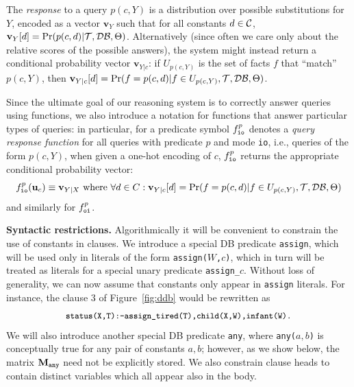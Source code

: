 \documentclass{article}
\newcommand{\cd}[1]{{\small \texttt{#1}}}
\newcommand{\mysubsection}[1]{\textbf{{#1}.}}
\newif\iflong
\newcommand{\longonly}[1]{\iflong{#1}\fi}
\newcommand{\trm}[1]{\textit{#1}}
\newcommand{\vek}[1]{\textbf{#1}}
\newcommand{\M}{\textbf{M}}
\newcommand{\C}{{\cal{C}}}
\newcommand{\T}{{\cal{T}}}
\newcommand{\DB}{{\cal{DB}}}
\begin{document}
The \trm{response} to a query $p(c,Y)$ is a distribution over possible
substitutions for $Y$, encoded as a vector $\vek{v}_{Y}$ such that for
all constants $d\in\C$, $\vek{v}_{Y}[d] = \Pr(p(c,d)|\T,\DB,\Theta)$.
Alternatively (since often we care only about the relative scores of
the possible answers), the system might instead return a conditional
probability vector $\vek{v}_{Y|c}$: if $U_{p(c,Y)}$ is the set
of facts $f$ that ``match'' $p(c,Y)$, then $\vek{v}_{Y|c}[d] =
\Pr(f=p(c,d)|f\in{}U_{p(c,Y)},\T,\DB,\Theta)$.

\longonly{Although here we only consider single-literal queries, more
  complex queries can be answered by extending the theory: e.g., to
  find $\{ Y: \cd{uncle(joe,X),husband(X,$Y$)}\}$, we could add the
  clause \cd{q1(J,Y):-uncle(joe,X),husband(X,Y)} to the theory and
  find the answer to \cd{q1(joe,Y)}.}

Since the ultimate goal of our reasoning system is to correctly answer
queries using functions, we also introduce a notation for functions
that answer particular types of queries: in particular, for a
predicate symbol $f^p_\cd{io}$ denotes a \trm{query response function}
for all queries with predicate $p$ and mode \cd{io}, i.e., queries of
the form $p(c,Y)$, when given a one-hot encoding of $c$, $f^p_\cd{io}$
returns the appropriate conditional probability vector:
\begin{equation} \label{eq:def-f}
 f^p_\cd{io}(\vek{u}_c) \equiv \vek{v}_{Y|X} 
    \mbox{~where~} \forall d\in C: \vek{v}_{Y|c}[d] =
             \Pr(f=p(c,d)|f\in{}U_{p(c,Y)},\T,\DB,\Theta)
\end{equation}
and similarly for $f^p_\cd{oi}$.

\mysubsection{Syntactic restrictions}
Algorithmically it will be convenient to constrain the use of
constants in clauses.  We introduce a special DB predicate
\cd{assign}, which will be used only in literals of the form
\cd{assign($W$,$c$)}, which in turn will be treated as literals for a
special unary predicate \cd{assign\_$c$}.  Without loss of generality,
we can now assume that constants only appear in \cd{assign} literals.
For instance, the clause 3 of Figure~\ref{fig:ddb} would be rewritten
as
\begin{equation} \label{eq:tired}
\cd{status(X,T):-assign\_tired(T),child(X,W),infant(W).}
\end{equation}
We will also introduce another special DB predicate \cd{any}, where
\cd{any($a,b$)} is conceptually true for any pair of constants $a,b$;
however, as we show below, the matrix $\M_\cd{any}$ need not be
explicitly stored.  We also constrain clause heads to contain distinct
variables which all appear also in the body.
\end{document}
